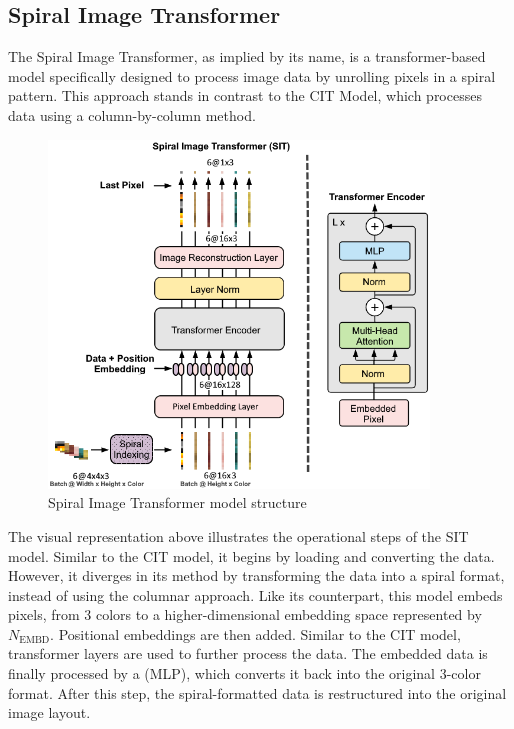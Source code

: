 

\subsection{Spiral Image Transformer}

    The Spiral Image Transformer, as implied by its name, is a transformer-based model specifically designed to process image data by unrolling pixels in a spiral pattern. This approach stands in contrast to the CIT Model, which processes data using a column-by-column method.

    \begin{figure}[H]
        \centering
        \includegraphics[width=0.9\textwidth]{imgs/SITModel.png}
        \caption{Spiral Image Transformer model structure}
        \label{fig:SpiralImageTransformer}
    \end{figure}

    The visual representation above illustrates the operational steps of the SIT model. Similar to the CIT model, it begins by loading and converting the data. However, it diverges in its method by transforming the data into a spiral format, instead of using the columnar approach. Like its counterpart, this model embeds pixels, from 3 colors to a higher-dimensional embedding space represented by \(N_{\text{EMBD}}\). Positional embeddings are then added. Similar to the CIT model, transformer layers are used to further process the data. The embedded data is finally processed by a (MLP), which converts it back into the original 3-color format. After this step, the spiral-formatted data is restructured into the original image layout.

